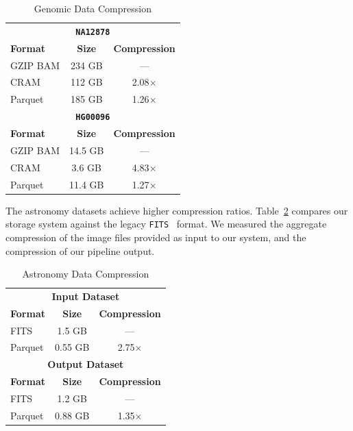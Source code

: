 \documentclass{sig-alternate}
\begin{document}
\begin{table}[h]
\caption{Genomic Data Compression}
\label{tab:genomic-compression}
\begin{center}
\begin{tabular}{ l c c }
\hline
\multicolumn{3}{c}{\bf \texttt{NA12878}} \\
\bf Format & \bf Size & \bf Compression \\
\hline
\hline
GZIP BAM & 234 GB & --- \\
CRAM & 112 GB & 2.08$\times$ \\
Parquet & 185 GB & 1.26$\times$ \\
\hline
\multicolumn{3}{c}{\bf \texttt{HG00096}} \\
\bf Format & \bf Size & \bf Compression \\
\hline
\hline
GZIP BAM & 14.5 GB & --- \\
CRAM & 3.6 GB & 4.83$\times$ \\
Parquet & 11.4 GB & 1.27$\times$ \\
\hline
\end{tabular}
\end{center}
\end{table}

The astronomy datasets achieve higher compression ratios. Table~\ref{tab:astro-compression} compares
our storage system against the legacy \texttt{FITS}~\cite{wells81} format. We measured the aggregate compression
of the image files provided as input to our system, and the compression of our pipeline output.

\begin{table}[h]
\caption{Astronomy Data Compression}
\label{tab:astro-compression}
\begin{center}
\begin{tabular}{ l c c }
\hline
\multicolumn{3}{c}{\bf Input Dataset} \\
\bf Format & \bf Size & \bf Compression \\
\hline
\hline
FITS & 1.5 GB & --- \\
Parquet & 0.55 GB & 2.75$\times$ \\
\hline
\multicolumn{3}{c}{\bf Output Dataset} \\
\bf Format & \bf Size & \bf Compression \\
\hline
\hline
FITS & 1.2 GB & --- \\
Parquet & 0.88 GB & 1.35$\times$ \\
\hline
\end{tabular}
\end{center}
\end{table}
\end{document}
